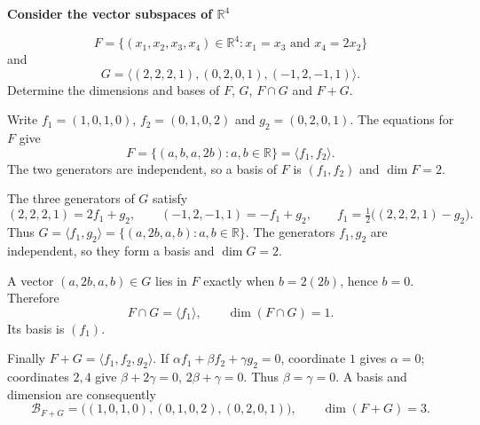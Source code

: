 \providecommand{\rank}{\operatorname{r}}
\providecommand{\RR}{\mathbb R}
\providecommand{\CC}{\mathbb C}
\providecommand{\KK}{\mathbb K}

\setcounter{enumi}{89}
\item {\bfseries\boldmath
Consider the vector subspaces of $\RR^4$
}

\[
F=\{(x_1,x_2,x_3,x_4)\in\RR^4:x_1=x_3\text{ and }x_4=2x_2\}
\]
and
\[
G=\langle(2,2,2,1),(0,2,0,1),(-1,2,-1,1)\rangle.
\]
Determine the dimensions and bases of $F$, $G$, $F\cap G$ and $F+G$.

\begin{answer}
Write $f_1=(1,0,1,0)$, $f_2=(0,1,0,2)$ and $g_2=(0,2,0,1)$.
The equations for $F$ give
\[
 F=\{(a,b,a,2b):a,b\in\RR\}=\langle f_1,f_2\rangle.
\]
The two generators are independent, so a basis of $F$ is $(f_1,f_2)$ and
$\dim F=2$.

The three generators of $G$ satisfy
\[
 (2,2,2,1)=2f_1+g_2,\qquad(-1,2,-1,1)=-f_1+g_2,
 \qquad f_1=\tfrac12\bigl((2,2,2,1)-g_2\bigr).
\]
Thus $G=\langle f_1,g_2\rangle=\{(a,2b,a,b):a,b\in\RR\}$.
The generators $f_1,g_2$ are independent, so they form a basis and $\dim G=2$.

A vector $(a,2b,a,b)\in G$ lies in $F$ exactly when $b=2(2b)$, hence $b=0$.
Therefore
\[
 F\cap G=\langle f_1\rangle,\qquad \dim(F\cap G)=1.
\]
Its basis is $(f_1)$.

Finally $F+G=\langle f_1,f_2,g_2\rangle$.
If $\alpha f_1+\beta f_2+\gamma g_2=0$, coordinate $1$ gives $\alpha=0$;
coordinates $2,4$ give $\beta+2\gamma=0$, $2\beta+\gamma=0$.
Thus $\beta=\gamma=0$. A basis and dimension are consequently
\[
 \boxed{\mathcal B_{F+G}=\bigl((1,0,1,0),(0,1,0,2),(0,2,0,1)\bigr),
 \qquad\dim(F+G)=3.}
\]
\end{answer}
